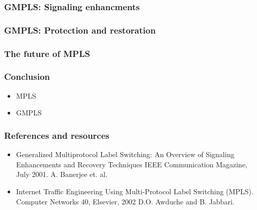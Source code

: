 \documentclass[12pt]{beamer}
\begin{document}
\begin{frame}
  \frametitle{GMPLS: Signaling enhancments}
\end{frame}

\begin{frame}
  \frametitle{GMPLS: Protection and restoration}
\end{frame}

\begin{frame}
  \frametitle{The future of MPLS}
\end{frame}

\begin{frame}
  \frametitle{Conclusion}
  \begin{itemize}
    \item MPLS
    \item GMPLS
  \end{itemize}
\end{frame}

\begin{frame}
  \frametitle{References and resources}
  \begin{itemize}
    \item Generalized Multiprotocol Label Switching: An Overview of Signaling Enhancements and Recovery Techniques
          IEEE Communication Magazine, July 2001.
          A. Banerjee et. al. 
    \item Internet Traffic Engineering Using Multi-Protocol Label Switching (MPLS).
          Computer Networks 40, Elsevier, 2002
          D.O. Awduche and B. Jabbari. 
  \end{itemize}
\end{frame}
\end{document}
